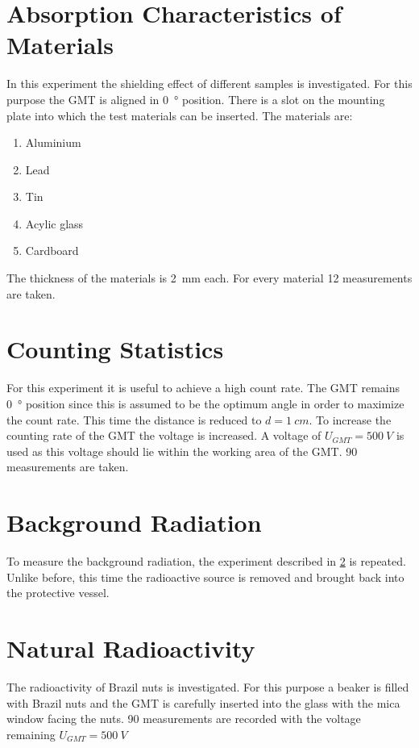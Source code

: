 \section{Absorption Characteristics of Materials}
In this experiment the shielding effect of different samples is investigated. For this purpose the GMT is aligned in
\SI[]{0}[]{\degree} position. There is a slot on the mounting plate into which the test materials can be inserted. The
materials are:
\begin{enumerate}
	\item Aluminium
	\item Lead
	\item Tin
	\item Acylic glass
	\item Cardboard
\end{enumerate}
The thickness of the materials is \SI[]{2}[]{mm} each. For every material 12 measurements are taken. %
%
\section{Counting Statistics} \label{sec:count_stat}
For this experiment it is useful to achieve a high count rate. The GMT remains \SI[]{0}[]{\degree} position since this is
assumed to be the optimum angle in order to maximize the count rate.
This time the distance is reduced to \(d = \SI[]{1}[]{cm}\). To increase the counting rate of the GMT the voltage is
increased. A voltage of \(U_{GMT} = \SI[]{500}[]{V}\) is used as this voltage should lie within the working area of the
GMT. 90 measurements are taken.
%
\section{Background Radiation}
To measure the background radiation, the experiment described in \cref{sec:count_stat} is repeated. Unlike
before, this time the radioactive source is removed and brought back into the protective vessel.
%
\section{Natural Radioactivity}
%
The radioactivity of Brazil nuts is investigated. For this purpose a beaker is filled with Brazil nuts and the
GMT is carefully inserted into the glass with the mica window facing the nuts. 90 measurements are recorded with the
voltage remaining \(U_{GMT} = \SI[]{500}[]{V}\) %